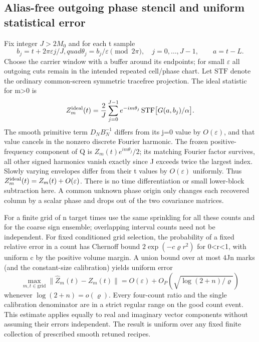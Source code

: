 \documentclass[11pt]{article}
\begin{document}
\subsection{Alias-free outgoing phase stencil and uniform statistical error}\label{alias-free-outgoing-phase-stencil-and-uniform-statistical-error}

Fix integer \(J>2M_0\) and for each t sample
\[
 b_j=t+2\pi\varepsilon j/J,quad
 \theta_j=b_j/\varepsilon\pmod{2\pi},\quad j=0,\dots,J-1,
 \qquad a=t-L.
\]
Choose the carrier window with a buffer around its endpoints; for small \(\varepsilon\) all outgoing cuts remain in the intended repeated cell/phase chart. Let \(\mathrm{STF}\) denote the ordinary common-screen symmetric tracefree projection. The ideal statistic for m\textgreater0 is
\[
 Z^{\rm ideal}_m(t)=\frac{2}{J}\sum_{j=0}^{J-1}
             e^{-im\theta_j}\,\mathrm{STF}\bigl[G(a,b_j)/\alpha\bigr].
\]
The smooth primitive term \(D_N B_N^{-1}\) differs from its j=0 value by \(O(\varepsilon)\), and that value cancels in the nonzero discrete Fourier harmonic. The frozen positive-frequency component of Q is \(Z_m(t)e^{im\theta_j}/2\); its matching Fourier factor survives, all other signed harmonics vanish exactly since J exceeds twice the largest index. Slowly varying envelopes differ from their t values by \(O(\varepsilon)\) uniformly. Thus \(Z^{\rm ideal}_m(t)=Z_m(t)+O(\varepsilon)\). There is no time differentiation or small lower-block subtraction here. A common unknown phase origin only changes each recovered column by a scalar phase and drops out of the two covariance matrices.

For a finite grid of n target times use the same sprinkling for all these counts and for the coarse sign ensemble; overlapping interval counts need not be independent. For fixed conditioned grid selection, the probability of a fixed relative error in a count has Chernoff bound \(2\exp(-c\varrho r^2)\) for 0\textless r\textless1, with uniform c by the positive volume margin. A union bound over at most 4Jn marks (and the constant-size calibration) yields uniform error
\[
 \max_{m,t\in\mathrm{grid}}
    \|\widehat Z_m(t)-Z_m(t)\|
     =O(\varepsilon)+O_P\!\left(\sqrt{\log(2+n)/\varrho}\right)
\]
whenever \(\log(2+n)=o(\varrho)\). Every four-count ratio and the single calibration denominator are in a strict regular range on the good count event. This estimate applies equally to real and imaginary vector components without assuming their errors independent. The result is uniform over any fixed finite collection of prescribed smooth retuned recipes.
\end{document}
